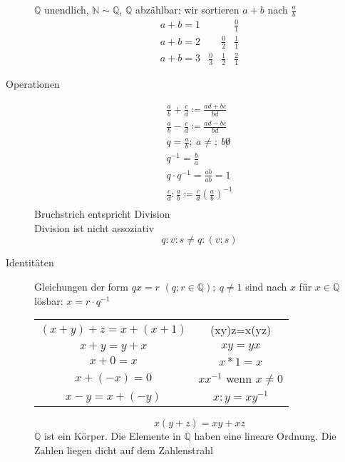 \begin{description}
    $\mathbb{Q}$ unendlich, $\mathbb{N} \sim \mathbb{Q}$, $\mathbb{Q}$ abzählbar: wir sortieren $a + b$ nach $\frac{a}{b}$
    \[\begin{array}{lccc}
          a + b = 1 &             &             & \frac{0}{1} \\
          a + b = 2 &             & \frac{0}{2} & \frac{1}{1} \\
          a + b = 3 & \frac{0}{3} & \frac{1}{2} & \frac{2}{1}
    \end{array}\]
    \item[Operationen]
    \begin{gather*}
        \frac{a}{b} + \frac{c}{d} \coloneqq \frac{ad+bc}{bd}\\
        \frac{a}{b} - \frac{c}{d} \coloneqq \frac{ad-bc}{bd}\\
        q = \frac{a}{b};\ a \not =;\ b \not 0\\
        q^{-1} = \frac{b}{a}\\
        q \cdot q^{-1} = \frac{ab}{ab} = 1\\
        \frac{c}{d}:\frac{a}{b}\coloneqq\frac{c}{d}  \left(\frac{a}{b}\right)^{-1}\\
    \end{gather*}
    Bruchstrich entspricht Division \\
    Division ist nicht assoziativ
    \[q:v:s \not = q:(v:s)\]
    \item[Identitäten] Gleichungen der form $qx=r$ $(q;r \in \mathbb{Q});\ q \not = 1$ sind nach $x$ für $x\in \mathbb{Q}$ lösbar: $x = r \cdot q^{-1}$ \\
    \begin{tabular}[t]{cc}
        $(x+y)+z = x+(x+1)$ & (xy)z=x(yz)                 \\
        $x + y = y + x$     & $xy = yx$                   \\
        $x + 0 = x$         & $x * 1 = x$                 \\
        $x + (-x) = 0$      & $xx^{-1}$ wenn $x \not = 0$ \\
        $x - y = x + (-y)$  & $x:y = xy^{-1}$
    \end{tabular}
    \[x(y+z) = xy + xz\]
    $\mathbb{Q}$ ist ein Körper.
    Die Elemente in $\mathbb{Q}$ haben eine lineare Ordnung.
    Die Zahlen liegen dicht auf dem Zahlenstrahl
\end{description}
